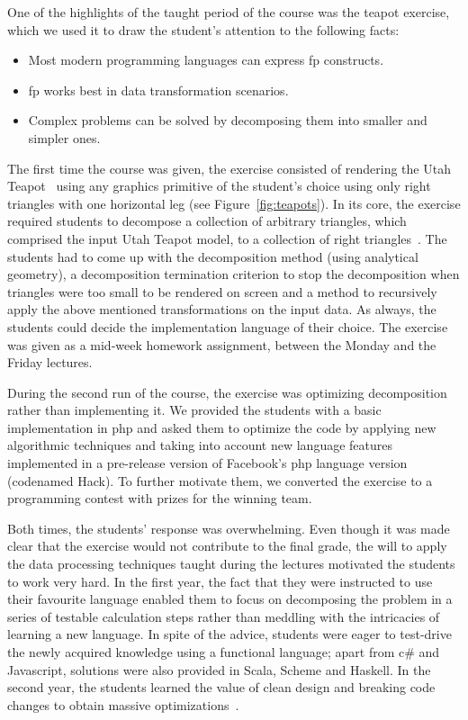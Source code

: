 \documentclass[conference]{sig-alternate}
\begin{document}
One of the highlights of the taught period of the course was the teapot
exercise, which we used it to draw the student's attention to the following
facts:

\begin{itemize}

  \item Most modern programming languages can express {\sc fp} constructs.

  \item {\sc fp} works best in data transformation scenarios.

  \item Complex problems can be solved by decomposing them into smaller and simpler ones.

\end{itemize}

The first time the course was given, the exercise consisted of rendering the
Utah Teapot~\cite{Torre06} using any graphics primitive of the student's choice
using only right triangles with one horizontal leg (see
Figure~\ref{fig:teapots}). In its core, the exercise required students to
decompose a collection of arbitrary triangles, which comprised the input Utah
Teapot model, to a collection of right triangles~\cite{Beckm13}. The students
had to come up with the decomposition method (using analytical geometry), a decomposition termination criterion to
stop the decomposition when triangles were too small to be rendered on screen
and a method to recursively apply the above mentioned transformations on the
input data. As always, the students could decide the implementation language of
their choice. The exercise was given as a mid-week homework assignment, between
the Monday and the Friday lectures.

During the second run of the course, the exercise was optimizing decomposition
rather than implementing it. We provided the students with a basic implementation in {\sc php} and asked them to optimize the code by applying new algorithmic techniques and taking into account new language features implemented in a 
pre-release version of Facebook's {\sc php} language version (codenamed Hack).
To further motivate them, we converted the exercise to a programming
contest with prizes for the winning team.

Both times, the students' response was overwhelming. Even though it was made
clear that the exercise would not contribute to the final grade, the will to
apply the data processing techniques taught during the lectures motivated the
students to work very hard. In the first year, the fact that they were
instructed to use their favourite language enabled them to focus on decomposing
the problem in a series of testable calculation steps rather than meddling with
the intricacies of learning a new language. In spite of the advice, students
were eager to test-drive the newly acquired knowledge using a functional
language; apart from {\sc c\#} and Javascript, solutions were also provided in
Scala, Scheme and Haskell. In the second year, the students learned the
value of clean design and breaking code changes to obtain massive
optimizations~\cite{Gousi13}.
\end{document}
